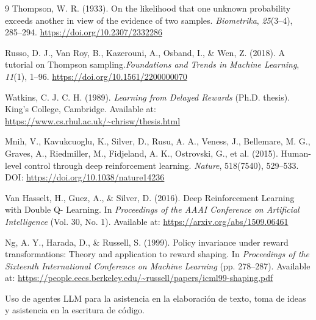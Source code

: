 \documentclass[a4paper, 10pt, twocolumn]{report}
\begin{document}
\begin{thebibliography}{9}
     Thompson, W. R. (1933). On the likelihood that one unknown probability exceeds another in view of the evidence of two samples. \textit{Biometrika}, \textit{25}(3--4), 285--294. \href{https://doi.org/10.2307/2332286}{https://doi.org/10.2307/2332286}

     Russo, D. J., Van Roy, B., Kazerouni, A., Osband, I., \& Wen, Z. (2018). A tutorial on Thompson sampling.\textit{Foundations and Trends in Machine Learning}, \textit{11}(1), 1--96. \href{https://doi.org/10.1561/2200000070}{https://doi.org/10.1561/2200000070}
    
    Watkins, C. J. C. H. (1989). \textit{Learning from Delayed Rewards} (Ph.D. thesis). King's  College, Cambridge. 
    Available at: \url{https://www.cs.rhul.ac.uk/~chrisw/thesis.html}
    
    Mnih, V., Kavukcuoglu, K., Silver, D., Rusu, A. A., Veness, J., Bellemare, M. G., Graves, A.,   Riedmiller, M., Fidjeland, A. K., Ostrovski, G., et al. (2015). Human-level control through deep  reinforcement learning. \textit{Nature}, 518(7540), 529--533. 
    DOI: \url{https://doi.org/10.1038/nature14236}
    
    Van Hasselt, H., Guez, A., \& Silver, D. (2016). Deep Reinforcement Learning with Double Q- Learning. In \textit{Proceedings of the AAAI Conference on Artificial Intelligence} (Vol. 30, No.    1). 
    Available at: \url{https://arxiv.org/abs/1509.06461}
    
    Ng, A. Y., Harada, D., \& Russell, S. (1999). Policy invariance under reward transformations:   Theory and application to reward shaping. In \textit{Proceedings of the Sixteenth International   Conference on Machine Learning} (pp. 278--287). 
    Available at: \url{https://people.eecs.berkeley.edu/~russell/papers/icml99-shaping.pdf}

    Uso de agentes LLM para la asistencia en la elaboración de texto, toma de ideas y asistencia en la escritura de código.
        
    \end{thebibliography}
\end{document}
